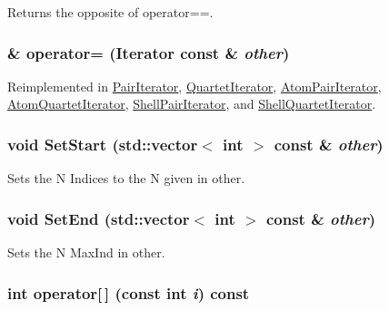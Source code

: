 Returns the opposite of operator==. \hypertarget{classJKBuilder_1_1Iterator_ae6f4f24e1855d2aaf89a8a60a9f1521b}{
\subsubsection[{operator=}]{ \& operator= ({\bf Iterator} const \& {\em other})}}
\label{classJKBuilder_1_1Iterator_ae6f4f24e1855d2aaf89a8a60a9f1521b}


Reimplemented in \hyperlink{classJKBuilder_1_1PairIterator_a698aa7b3d6495bd74dcff5b93be868a8}{PairIterator}, \hyperlink{classJKBuilder_1_1QuartetIterator_ab3cd17222545586596dbbc6aa3ca7046}{QuartetIterator}, \hyperlink{classJKBuilder_1_1AtomPairIterator_aefda578091b26523e72740cec884aa45}{AtomPairIterator}, \hyperlink{classJKBuilder_1_1AtomQuartetIterator_a39f50a07009d2e9e81e1d64da594084f}{AtomQuartetIterator}, \hyperlink{classJKBuilder_1_1ShellPairIterator_af3001050bade3a939d83971d1a3f47e7}{ShellPairIterator}, and \hyperlink{classJKBuilder_1_1ShellQuartetIterator_acd8ac6ed2e831bcb87e65acc0de747db}{ShellQuartetIterator}.\hypertarget{classJKBuilder_1_1Iterator_aa83de505e29125c1d3ac7bb1b13ca15a}{
\subsubsection[{SetStart}]{\setlength{\rightskip}{0pt plus 5cm}void SetStart (std::vector$<$ int $>$ const \& {\em other})}}
\label{classJKBuilder_1_1Iterator_aa83de505e29125c1d3ac7bb1b13ca15a}


Sets the N Indices to the N given in other. \hypertarget{classJKBuilder_1_1Iterator_aad84ec668b5f41210db34c540aaa31fc}{
\subsubsection[{SetEnd}]{\setlength{\rightskip}{0pt plus 5cm}void SetEnd (std::vector$<$ int $>$ const \& {\em other})}}
\label{classJKBuilder_1_1Iterator_aad84ec668b5f41210db34c540aaa31fc}


Sets the N MaxInd in other. \hypertarget{classJKBuilder_1_1Iterator_a74247cf730a06b23fcb1ec64e5596b25}{
\subsubsection[{operator[]}]{\setlength{\rightskip}{0pt plus 5cm}int operator\mbox{[}$\,$\mbox{]} (const int {\em i}) const}}
\label{classJKBuilder_1_1Iterator_a74247cf730a06b23fcb1ec64e5596b25}


